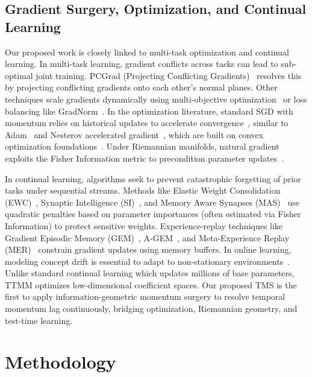 \documentclass{article}
\theoremstyle{plain}
\theoremstyle{definition}
\theoremstyle{remark}
\begin{document}
\subsection{Gradient Surgery, Optimization, and Continual Learning}
Our proposed work is closely linked to multi-task optimization and continual learning. In multi-task learning, gradient conflicts across tasks can lead to sub-optimal joint training. PCGrad (Projecting Conflicting Gradients)~\citep{yu2020gradient} resolves this by projecting conflicting gradients onto each other's normal planes. Other techniques scale gradients dynamically using multi-objective optimization~\citep{sener2018multi} or loss balancing like GradNorm~\citep{chen2018gradnorm}. In the optimization literature, standard SGD with momentum relies on historical updates to accelerate convergence~\citep{polyak1964some,sutskever2013importance}, similar to Adam~\citep{kingma2014adam} and Nesterov accelerated gradient~\citep{nesterov1983method}, which are built on convex optimization foundations~\citep{nesterov1983method,shalev2014online}. Under Riemannian manifolds, natural gradient exploits the Fisher Information metric to precondition parameter updates~\citep{amari1998natural,martens2015optimizing}.

In continual learning, algorithms seek to prevent catastrophic forgetting of prior tasks under sequential streams. Methods like Elastic Weight Consolidation (EWC)~\citep{kirkpatrick2017overcoming}, Synaptic Intelligence (SI)~\citep{zenke2017continual}, and Memory Aware Synapses (MAS)~\citep{aljundi2018memory} use quadratic penalties based on parameter importances (often estimated via Fisher Information) to protect sensitive weights. Experience-replay techniques like Gradient Episodic Memory (GEM)~\citep{lopez2017gradient}, A-GEM~\citep{chaudhry2018efficient}, and Meta-Experience Replay (MER)~\citep{riemer2018learning} constrain gradient updates using memory buffers. In online learning, modeling concept drift is essential to adapt to non-stationary environments~\citep{gama2014survey}. Unlike standard continual learning which updates millions of base parameters, TTMM optimizes low-dimensional coefficient spaces. Our proposed TMS is the first to apply information-geometric momentum surgery to resolve temporal momentum lag continuously, bridging optimization, Riemannian geometry, and test-time learning.

\section{Methodology}
\label{sec:method}
\end{document}
